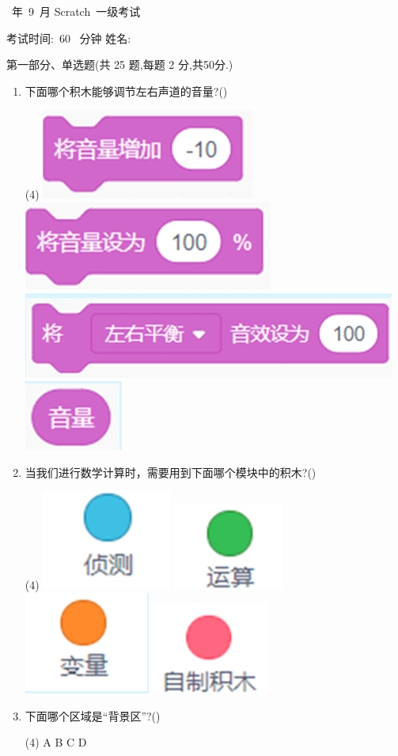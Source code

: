 \documentclass[10.5pt, a4paper]{article}
\renewcommand{\title}[3]{
    \begin{center}
        \Large\heiti #1~年~#2~月 Scratch~#3级考试
    \end{center}
}
\newcommand{\TimeAndName}[1]{
    \begin{center}
        考试时间:~#1~ 分钟 \qquad\qquad\qquad\qquad 姓名:\underline{\quad\quad\quad\quad}
    \end{center}
}
\begin{document}
    \title{2020}{9}{一}
    
    \TimeAndName{60}
    
    \vspace{1cm}
    {\noindent\heiti 第一部分、单选题(共 25 题,每题 2 分,共50分.)}

    \begin{enumerate}
        \item 下面哪个积木能够调节左右声道的音量?(\qquad)
        \begin{tasks}(4)
            \task \includegraphics[width=.1\textwidth]{1a.png}
            \task \includegraphics[width=.12\textwidth]{1b.png}
            \task \includegraphics[width=.18\textwidth]{1c.png}
            \task \includegraphics[width=.05\textwidth]{1d.png}
        \end{tasks}

        \item 当我们进行数学计算时，需要用到下面哪个模块中的积木?(\qquad)
        \begin{tasks}(4)
            \task \includegraphics[width=.05\textwidth]{2a.png}
            \task \includegraphics[width=.05\textwidth]{2b.png}
            \task \includegraphics[width=.05\textwidth]{2c.png}
            \task \includegraphics[width=.05\textwidth]{2d.png}
        \end{tasks}

        \item 下面哪个区域是“背景区”?(\qquad)
        \begin{tasks}(4)
            \task A
            \task B
            \task C
            \task D
        \end{tasks}


\end{enumerate}
\end{document}
